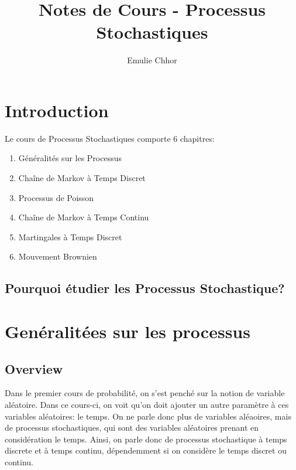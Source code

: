 \documentclass{article}
\begin{document}
\title{Notes de Cours - Processus Stochastiques}
\author{Emulie Chhor}
\maketitle

\section*{Introduction}

Le cours de Processus Stochastiques comporte 6 chapitres:

    \begin{enumerate}
	\item Généralités sur les Processus
	\item Chaîne de Markov à Temps Discret
	\item Processus de Poisson
	\item Chaîne de Markov à Temps Continu
	\item Martingales à Temps Discret
	\item Mouvement Brownien
    \end{enumerate}

\newtheorem{definition}{Definition}[subsection]
\newtheorem{theorem}{Theorem}[subsection]
\newtheorem{corollary}{Corollary}[subsection]
\newtheorem{lemma}[theorem]{Lemma}
\newtheorem{proposition}{Proposition}[section]
\newtheorem{axiom}{Axiome}
\newtheorem{property}{Propriété}[subsection]
\newtheorem*{remark}{Remarque}
\newtheorem*{problem}{Problème}
\newtheorem*{intuition}{Intuition}

\subsection{Pourquoi étudier les Processus Stochastique?}

\pagebreak
\section{Genéralitées sur les processus}

\subsection{Overview}

Dans le premier cours de probabilité, on s'est penché sur la notion de variable
aléatoire. Dans ce cours-ci, on voit qu'on doit ajouter un autre paramètre à
ces variables aléatoires: le temps. On ne parle donc plus de variables aléaoires,
mais de processus stochastiques, qui sont des variables aléatoires prenant en
considération le temps. Ainsi, on parle donc de processus stochastique à temps
discrete et à temps continu, dépendemment si on considère le temps discret ou
continu.
\end{document}
